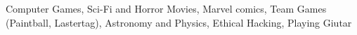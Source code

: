 
\begin{cvparagraph}
  {Computer Games, Sci-Fi and Horror Movies, Marvel comics, Team Games (Paintball, Lastertag), Astronomy and Physics, Ethical Hacking, Playing Giutar}
\end{cvparagraph}

